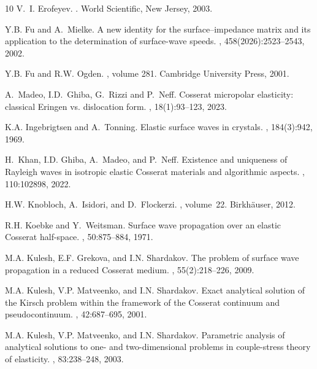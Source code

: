 \documentclass[10pt]{article}
\begin{document}
\begin{footnotesize}
\begin{thebibliography}{10}
	V.~I. Erofeyev.
	.
	\newblock World Scientific, New Jersey, 2003.
	
	Y.B. Fu and A.~Mielke.
	\newblock A new identity for the surface--impedance matrix and its application
	to the determination of surface-wave speeds.
	,
	458(2026):2523--2543, 2002.
	
	Y.B. Fu and R.W. Ogden.
	, volume
	281.
	\newblock Cambridge University Press, 2001.
	
	A.~Madeo, I.D.~Ghiba, G.~Rizzi and P.~Neff.
	\newblock Cosserat micropolar elasticity: classical  {Eringen} vs. dislocation
	form.
	,
	18(1):93--123, 2023.
	
	K.A. Ingebrigtsen and A.~Tonning.
	\newblock Elastic surface waves in crystals.
	, 184(3):942, 1969.
	
	H.~Khan, I.D. Ghiba, A.~Madeo, and P.~Neff.
	\newblock Existence and uniqueness of {Rayleigh} waves in isotropic elastic
	{Cosserat} materials and algorithmic aspects.
	, 110:102898, 2022.
	
	H.W. Knobloch, A.~Isidori, and D.~Flockerzi.
	, volume~22.
	\newblock Birkh{\"a}user, 2012.
	
	R.H. Koebke and Y.~Weitsman.
	\newblock Surface wave propagation over an elastic {Cosserat} half-space.
	, 50:875--884, 1971.
	
	M.A. Kulesh, E.F. Grekova, and I.N. Shardakov.
	\newblock The problem of surface wave propagation in a reduced Cosserat
	medium.
	, 55(2):218--226, 2009.
	
	M.A. Kulesh, V.P. Matveenko, and I.N. Shardakov.
	\newblock Exact analytical solution of the {K}irsch problem within the
	framework of the {C}osserat continuum and pseudocontinuum.
	, 42:687--695, 2001.
	
	M.A. Kulesh, V.P. Matveenko, and I.N. Shardakov.
	\newblock Parametric analysis of analytical solutions to one- and
	two-dimensional problems in couple-stress theory of elasticity.
	,
	83:238--248, 2003.
	

\end{thebibliography}
\end{footnotesize}
\end{document}
